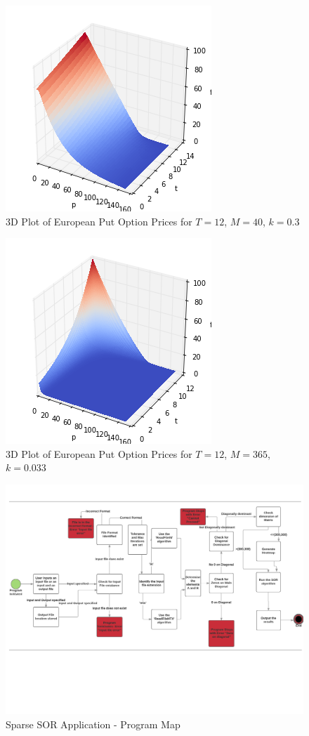 \documentclass[paper=a4, fontsize=10pt]{scrartcl} %
\begin{document}
\begin{figure}[h!]
\center
\includegraphics[scale=0.8]{3d_k_12_40.png}
\caption{3D Plot of European Put Option Prices for $T=12$, $M=40$, $k=0.3$}
\end{figure}

\begin{figure}[h!]
\center
\includegraphics[scale=0.8]{3d_k_12_365.png}
\caption{3D Plot of European Put Option Prices for $T=12$, $M=365$, $k=0.033$}
\end{figure}


\clearpage
\begin{landscape}
\begin{figure}[h!]
\center
\includegraphics[scale=0.8]{NASprog.pdf}
\caption{Sparse SOR Application - Program Map}
\end{figure}
\end{landscape}

\clearpage


 
\end{document}
